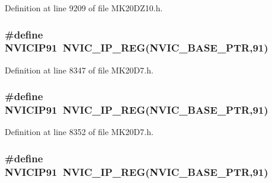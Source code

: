 Definition at line 9209 of file M\+K20\+D\+Z10.\+h.

\subsubsection[{\texorpdfstring{N\+V\+I\+C\+I\+P91}{NVICIP91}}]{\setlength{\rightskip}{0pt plus 5cm}\#define N\+V\+I\+C\+I\+P91~{\bf N\+V\+I\+C\+\_\+\+I\+P\+\_\+\+R\+EG}({\bf N\+V\+I\+C\+\_\+\+B\+A\+S\+E\+\_\+\+P\+TR},91)}\hypertarget{group___n_v_i_c___register___accessor___macros_ga98ab83798b21a9dc90c275d1b95c3a30}{}\label{group___n_v_i_c___register___accessor___macros_ga98ab83798b21a9dc90c275d1b95c3a30}


Definition at line 8347 of file M\+K20\+D7.\+h.

\subsubsection[{\texorpdfstring{N\+V\+I\+C\+I\+P91}{NVICIP91}}]{\setlength{\rightskip}{0pt plus 5cm}\#define N\+V\+I\+C\+I\+P91~{\bf N\+V\+I\+C\+\_\+\+I\+P\+\_\+\+R\+EG}({\bf N\+V\+I\+C\+\_\+\+B\+A\+S\+E\+\_\+\+P\+TR},91)}\hypertarget{group___n_v_i_c___register___accessor___macros_ga98ab83798b21a9dc90c275d1b95c3a30}{}\label{group___n_v_i_c___register___accessor___macros_ga98ab83798b21a9dc90c275d1b95c3a30}


Definition at line 8352 of file M\+K20\+D7.\+h.

\subsubsection[{\texorpdfstring{N\+V\+I\+C\+I\+P91}{NVICIP91}}]{\setlength{\rightskip}{0pt plus 5cm}\#define N\+V\+I\+C\+I\+P91~{\bf N\+V\+I\+C\+\_\+\+I\+P\+\_\+\+R\+EG}({\bf N\+V\+I\+C\+\_\+\+B\+A\+S\+E\+\_\+\+P\+TR},91)}\hypertarget{group___n_v_i_c___register___accessor___macros_ga98ab83798b21a9dc90c275d1b95c3a30}{}\label{group___n_v_i_c___register___accessor___macros_ga98ab83798b21a9dc90c275d1b95c3a30}


